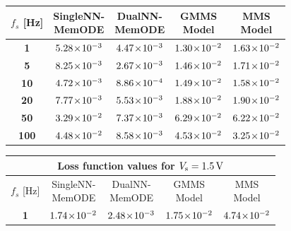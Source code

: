 \documentclass{ieeeaccess}
\begin{document}
\begin{table}
\begin{tabular}{c|cccc}
    \(f_s\) [Hz] & \makecell{SingleNN-\\MemODE} & \makecell{DualNN-\\ MemODE} & \makecell{GMMS\\Model} & \makecell{MMS\\Model}\\ 
    \midrule
\cline{1-5}
\multicolumn{1}{|c|}{\textbf{1}} &  \(5.28 \!\times\! 10^{-3}\)  &  \color{ieeegreen} \bfseries \(4.47 \!\times\! 10^{-3}\)  &  \(1.30 \!\times\! 10^{-2}\)  & \multicolumn{1}{c|}{\color{ieeered} \bfseries \(1.63 \!\times\! 10^{-2}\) } \\
\cline{1-5}
\textbf{5} & \(8.25 \!\times\! 10^{-3}\) & \color{ieeegreen} \bfseries \(2.67 \!\times\! 10^{-3}\) & \(1.46 \!\times\! 10^{-2}\) & \color{ieeered} \bfseries \(1.71 \!\times\! 10^{-2}\) \\
\textbf{10} & \(4.72 \!\times\! 10^{-3}\) & \color{ieeegreen} \bfseries \(8.86 \!\times\! 10^{-4}\) & \(1.49 \!\times\! 10^{-2}\) & \color{ieeered} \bfseries \(1.58 \!\times\! 10^{-2}\) \\
\textbf{20} & \(7.77 \!\times\! 10^{-3}\) & \color{ieeegreen} \bfseries \(5.53 \!\times\! 10^{-3}\) & \(1.88 \!\times\! 10^{-2}\) & \color{ieeered} \bfseries \(1.90 \!\times\! 10^{-2}\) \\
\textbf{50} & \(3.29 \!\times\! 10^{-2}\) & \color{ieeegreen} \bfseries \(7.37 \!\times\! 10^{-3}\) & \color{ieeered} \bfseries \(6.29 \!\times\! 10^{-2}\) & \(6.22 \!\times\! 10^{-2}\) \\
\cline{1-5}
\multicolumn{1}{|c|}{\textbf{100}} &  \(4.48 \!\times\! 10^{-2}\)  &  \color{ieeegreen} \bfseries \(8.58 \!\times\! 10^{-3}\)  &  \color{ieeered} \bfseries \(4.53 \!\times\! 10^{-2}\)  & \multicolumn{1}{c|}{\(3.25 \!\times\! 10^{-2}\) } \\
\cline{1-5}
    \bottomrule
  \end{tabular}
  \begin{tabular}{c|cccc}
    \toprule
    \multicolumn{5}{c}{\textbf{Loss function values for \(V_{\mathrm s}  = 1.5 \,{\mathrm V}\)}}  \\
    \midrule
    \(f_s\) [Hz] & \makecell{SingleNN-\\MemODE} & \makecell{DualNN-\\ MemODE} & \makecell{GMMS\\Model} & \makecell{MMS\\Model}\\
    \midrule
\textbf{1} & \(1.74 \!\times\! 10^{-2}\) & \color{ieeegreen} \bfseries \(2.48 \!\times\! 10^{-3}\) & \(1.75 \!\times\! 10^{-2}\) & \color{ieeered} \bfseries \(4.74 \!\times\! 10^{-2}\) \\

\end{tabular}
\end{table}
\end{document}
